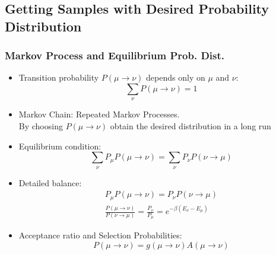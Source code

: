 \documentclass[10pt]{beamer}
\begin{document}
\subsection{Getting Samples with Desired Probability Distribution}
\begin{frame}
\frametitle{Markov Process and Equilibrium Prob. Dist.}

\begin{itemize}
\item Transition probability $P(\mu \rightarrow \nu)$ depends only on $\mu$ and $\nu$: 
\begin{equation}
\sum\limits_{\nu} P(\mu \rightarrow \nu) =1
\end{equation}
\item Markov Chain: Repeated Markov Processes.  \\
By choosing $P(\mu \rightarrow \nu)$ obtain the desired distribution in a long run 
\item \small Equilibrium condition: 
\begin{equation}
\sum\limits_{\nu} P_\mu P(\mu \rightarrow \nu) = \sum\limits_{\nu} P_\nu P(\nu \rightarrow \mu)  
\end{equation}
\item \small Detailed balance: 
\begin{gather}
 P_\mu P(\mu \rightarrow \nu) = P_\nu P(\nu \rightarrow \mu) \\
\frac{P(\mu \rightarrow \nu)}{P(\nu \rightarrow \mu)} = \frac{P_\nu }{P_\mu } = e^ {-\beta (E_\nu - E_\mu)}
\end{gather}
\item \small Acceptance ratio and Selection Probabilities: 
\begin{equation}
P(\mu \rightarrow \nu) = g(\mu \rightarrow \nu) A(\mu \rightarrow \nu)
\end{equation}

\end{itemize}

\end{frame}
\end{document}
